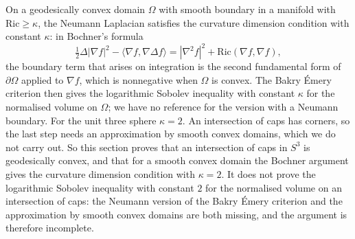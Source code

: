 On a geodesically convex domain $\Omega$ with smooth boundary in a manifold with $\mathrm{Ric}\ge\kappa$, the Neumann Laplacian satisfies the curvature dimension condition with constant $\kappa$: in Bochner's formula
\[
\tfrac12\Delta|\nabla f|^2-\langle\nabla f,\nabla\Delta f\rangle=|\nabla^2f|^2+\mathrm{Ric}(\nabla f,\nabla f),
\]
the boundary term that arises on integration is the second fundamental form of $\partial\Omega$ applied to $\nabla f$, which is nonnegative when $\Omega$ is convex. The Bakry \'Emery criterion then gives the logarithmic Sobolev inequality with constant $\kappa$ for the normalised volume on $\Omega$; we have no reference for the version with a Neumann boundary. For the unit three sphere $\kappa=2$. An intersection of caps has corners, so the last step needs an approximation by smooth convex domains, which we do not carry out. So this section proves that an intersection of caps in $S^3$ is geodesically convex, and that for a smooth convex domain the Bochner argument gives the curvature dimension condition with $\kappa=2$. It does not prove the logarithmic Sobolev inequality with constant $2$ for the normalised volume on an intersection of caps: the Neumann version of the Bakry \'Emery criterion and the approximation by smooth convex domains are both missing, and the argument is therefore incomplete.
